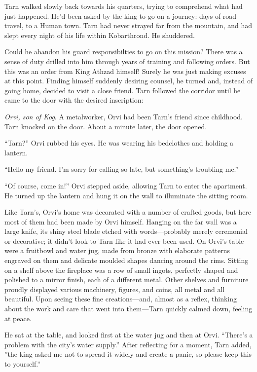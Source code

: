 
Tarn walked slowly back towards his quarters, trying to comprehend what had just happened.  He'd been asked by the king to go on a journey: days of road travel, to a Human town.  Tarn had never strayed far from the mountain, and had slept every night of his life within Kobarthrond.  He shuddered.

Could he abandon his guard responsibilties to go on this mission?  There was a sense of duty drilled into him through years of training and following orders.  But this was an order from King Athzad himself!  Surely he was just making excuses at this point.  Finding himself suddenly desiring counsel, he turned and, instead of going home, decided to visit a close friend.  Tarn followed the corridor until he came to the door with the desired inscription:


\emph{Orvi, son of Kog}.  A metalworker, Orvi had been Tarn's friend since childhood.  Tarn knocked on the door.  About a minute later, the door opened.

``Tarn?''  Orvi rubbed his eyes.  He was wearing his bedclothes and holding a lantern.

``Hello my friend.  I'm sorry for calling so late, but something's troubling me.''

``Of course, come in!''  Orvi stepped aside, allowing Tarn to enter the apartment.  He turned up the lantern and hung it on the wall to illuminate the sitting room.

Like Tarn's, Orvi's home was decorated with a number of crafted goods, but here most of them had been made by Orvi himself.  Hanging on the far wall was a large knife, its shiny steel blade etched with words---probably merely ceremonial or decorative; it didn't look to Tarn like it had ever been used.  On Orvi's table were a fruitbowl and water jug, made from bronze with elaborate patterns engraved on them and delicate moulded shapes dancing around the rims.   Sitting on a shelf above the fireplace was a row of small ingots, perfectly shaped and polished to a mirror finish, each of a different metal.  Other shelves and furniture proudly displayed various machinery, figures, and coins, all metal and all beautiful.  Upon seeing these fine creations---and, almost as a reflex, thinking about the work and care that went into them---Tarn quickly calmed down, feeling at peace.

He sat at the table, and looked first at the water jug and then at Orvi.  ``There's a problem with the city's water supply.''  After reflecting for a moment, Tarn added, ''the king asked me not to spread it widely and create a panic, so please keep this to yourself.''

